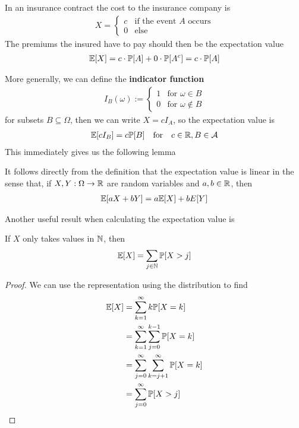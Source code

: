 \begin{ex}[]
  In an insurance contract the cost to the insurance company is
  \begin{align*}
    X = \left\{\begin{array}{ll}
      c & \text{if the event $A$ occurs} \\
      0 & \text{else}
    \end{array} \right.
  \end{align*}
  The premiums the insured have to pay should then be the expectation value
  \begin{align*}
    \mathbb{E}[X] = c \cdot \mathbb{P}[A] + 0 \cdot \mathbb{P}[A^{c}] = c \cdot \mathbb{P}[A]
  \end{align*}
\end{ex}
More generally, we can define the \textbf{indicator function}
\begin{align*}
  I_B(\omega) := \left\{\begin{array}{ll}
      1 & \text{for } \omega \in B \\
     0 & \text{for } \omega \notin B
  \end{array} \right.
\end{align*}
  for subsets $B \subseteq \Omega$, then we can write $X = c I_A$, so the expectation value is
  \begin{align*}
    \mathbb{E}[cI_B] = c \mathbb{P}[B] \quad \text{for} \quad c \in \mathbb{R}, B \in \mathcal{A}
  \end{align*}
This immediately gives us the following lemma
\begin{lem}
  It follows directly from the definition that the expectation value is linear in the sense that, if $X,Y: \Omega \to \mathbb{R}$ are random variables and $a,b \in \mathbb{R}$, then
  \begin{align*}
    \mathbb{E}[aX + bY] = a\mathbb{E}[X] + bE[Y]
  \end{align*}
\end{lem}

Another useful result when calculating the expectation value is
\begin{lem}[]
If $X$ only takes values in $\mathbb{N}$, then
\begin{align*}
  \mathbb{E}[X]= \sum_{j \in \mathbb{N}} \mathbb{P}[X > j]
\end{align*}
\end{lem}
\begin{proof}
  We can use the representation using the distribution to find
  \begin{align*}
    \mathbb{E}[X] &= \sum_{k=1}^{\infty} k \mathbb{P}[X = k]\\
    &= \sum_{k=1}^{\infty}\sum_{j=0}^{k-1}\mathbb{P}[X = k]\\
    &= \sum_{j=0}^{\infty}\sum_{k=j+1}^{\infty}\mathbb{P}[X=k]\\
    &=\sum_{j=0}^{\infty} \mathbb{P}[X > j]
  \end{align*}
\end{proof}

